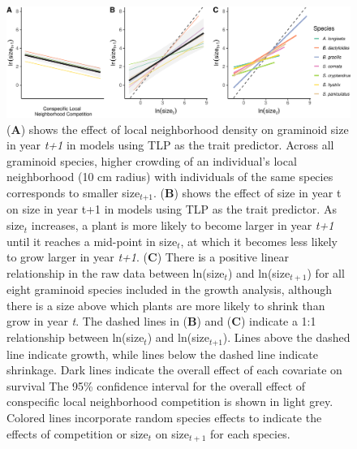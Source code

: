 \documentclass[12pt, letterpaper]{article}
\begin{document}
\begin{figure}
    \centering
    \includegraphics[width=1\textwidth]{figures/growthEffectPlots-1.pdf}
    \caption{(\textbf{A}) shows the effect of local neighborhood density on graminoid size in year \textit{t+1} in models using TLP as the trait predictor. Across all graminoid species, higher crowding of an individual’s local neighborhood (10 cm radius) with individuals of the same species corresponds to smaller size$_\textit{t+1}$. (\textbf{B}) shows the effect of size in year t on size in year t+1 in models using TLP as the trait predictor. As size$_\textit{t}$ increases, a plant is more likely to become larger in year \textit{t+1} until it reaches a mid-point in size$_\textit{t}$, at which it becomes less likely to grow larger in year \textit{t+1}. (\textbf{C}) There is a positive linear relationship in the raw data between ln(size$_\textit{t}$) and ln(size$_{t+1}$) for all eight graminoid species included in the growth analysis, although there is a size above which plants are more likely to shrink than grow in year \textit{t}. The dashed lines in (\textbf{B}) and (\textbf{C}) indicate a 1:1 relationship between ln(size$_\textit{t}$) and ln(size$_\textit{t+1}$). Lines above the dashed line indicate growth, while lines below the dashed line indicate shrinkage. Dark lines indicate the overall effect of each covariate on survival The 95\% confidence interval for the overall effect of conspecific local neighborhood competition is shown in light grey. Colored lines incorporate random species effects to indicate the effects of competition or size$_{t}$ on size$_{t+1}$ for each species. 
    }
    \label{fig:Effects_Growth}
\end{figure}
\end{document}
